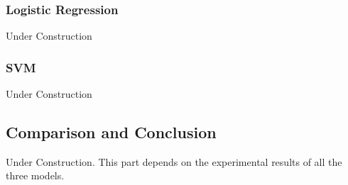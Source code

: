 \subsubsection{Logistic Regression}
Under Construction

\subsubsection{SVM}
Under Construction

\subsection{Comparison and Conclusion}
Under Construction. This part depends on the experimental results of all the three models.
